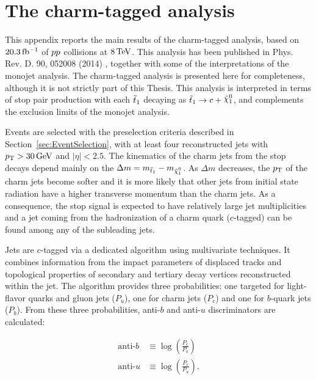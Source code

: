 \chapter{The charm-tagged analysis}
    \label{app:CharmTaggedAnalysis}

This appendix reports the main results of the charm-tagged analysis, based on $\unit[20.3]{fb^{-1}}$ of $pp$ collisions at $\unit[8]{TeV}$.
This analysis has been published in Phys. Rev. D. 90, 052008 (2014) \cite{Aad:2014nra}, together with some of the interpretations of the monojet analysis.
The charm-tagged analysis is presented here for completeness, although it is not strictly part of this Thesis.
This analysis is interpreted in terms of stop pair production with each $\tilde{t}_1$ decaying as $\stoptocharm$, and complements the exclusion limits of the monojet analysis.

Events are selected with the preselection criteria described in Section~\ref{sec:EventSelection}, with at least four reconstructed jets with $\pt>\unit[30]{GeV}$ and $|\eta|<2.5$.
The kinematics of the charm jets from the stop decays depend mainly on the $\Delta m = m_{\stopone} - m_{\ninoone}$.
As $\Delta m$ decreases, the $p_{\mathrm{T}}$ of the charm jets become softer and it is more likely that other jets from initial state radiation have a higher transverse momentum than the charm jets.
As a consequence, the stop signal is expected to have relatively large jet multiplicities and a jet coming from the hadronization of a charm quark ($c$-tagged) can be found among any of the subleading jets.

Jets are $c$-tagged via a dedicated algorithm using multivariate techniques.
It combines information from the impact parameters of displaced tracks and topological properties of secondary and tertiary decay vertices reconstructed within the jet.
The algorithm provides three probabilities: one targeted for light-flavor quarks and gluon jets ($P_u$), one for charm jets ($P_c$) and one for $b$-quark jets ($P_b$).
From these three probabilities, anti-$b$ and anti-$u$ discriminators are calculated:

\begin{equation}
\begin{split}
\text{anti-}b &\equiv \log{\left(\frac{P_c}{P_b}\right)} \\
\text{anti-}u &\equiv \log{\left(\frac{P_c}{P_u}\right)}.
\end{split}
\label{eq:charmTagDiscriminators}
\end{equation}


